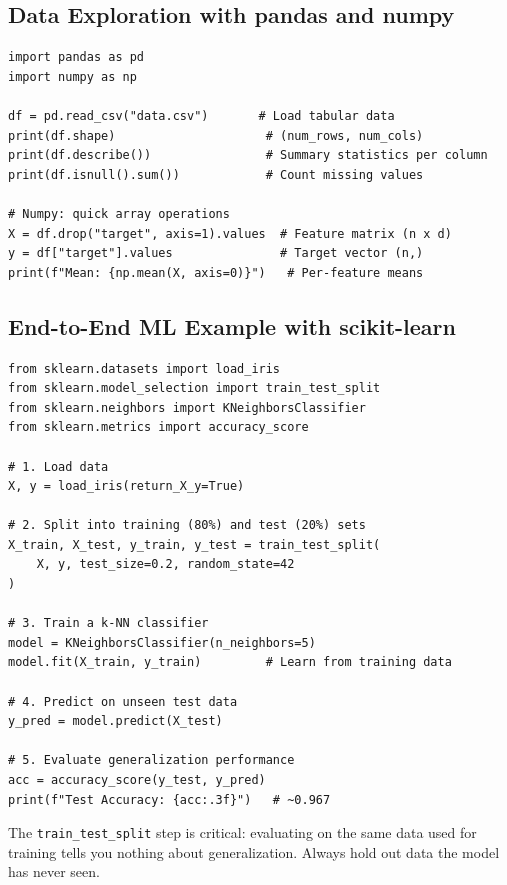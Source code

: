 \subsection*{Data Exploration with pandas and numpy}

\begin{lstlisting}[style=pythonstyle]
import pandas as pd
import numpy as np

df = pd.read_csv("data.csv")       # Load tabular data
print(df.shape)                     # (num_rows, num_cols)
print(df.describe())                # Summary statistics per column
print(df.isnull().sum())            # Count missing values

# Numpy: quick array operations
X = df.drop("target", axis=1).values  # Feature matrix (n x d)
y = df["target"].values               # Target vector (n,)
print(f"Mean: {np.mean(X, axis=0)}")   # Per-feature means
\end{lstlisting}

\subsection*{End-to-End ML Example with scikit-learn}

\begin{lstlisting}[style=pythonstyle]
from sklearn.datasets import load_iris
from sklearn.model_selection import train_test_split
from sklearn.neighbors import KNeighborsClassifier
from sklearn.metrics import accuracy_score

# 1. Load data
X, y = load_iris(return_X_y=True)

# 2. Split into training (80%) and test (20%) sets
X_train, X_test, y_train, y_test = train_test_split(
    X, y, test_size=0.2, random_state=42
)

# 3. Train a k-NN classifier
model = KNeighborsClassifier(n_neighbors=5)
model.fit(X_train, y_train)         # Learn from training data

# 4. Predict on unseen test data
y_pred = model.predict(X_test)

# 5. Evaluate generalization performance
acc = accuracy_score(y_test, y_pred)
print(f"Test Accuracy: {acc:.3f}")   # ~0.967
\end{lstlisting}

\begin{remark}
The \texttt{train\_test\_split} step is critical: evaluating on the same data used for training tells you nothing about generalization. Always hold out data the model has never seen.
\end{remark}
